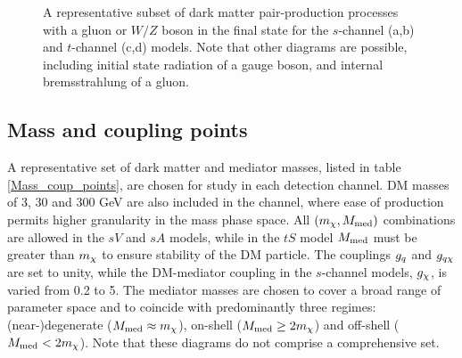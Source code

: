 \begin{figure}[t]
\begin{subfigure}[b]{0.4\textwidth}
{
    }
    \caption{}
    \label{fig:FD_tS_gluonISR}
  \end{subfigure}
  \hspace{1cm}
  \begin{subfigure}[b]{0.4\textwidth}
    \centering
    \caption{}
    \label{fig:FD_tS_WZmediator}
  \end{subfigure}
  \caption{A representative subset of dark matter pair-production processes with a gluon or $W/Z$ boson in the final state for the $s$-channel (a,b) and $t$-channel (c,d) models. Note that other diagrams are possible, including initial state radiation of a gauge boson, and internal bremsstrahlung of a gluon.}
  \label{allchannel_sig_phen}
\end{figure}

\subsection{Mass and coupling points}
A representative set of dark matter and mediator masses, listed in table \ref{Mass_coup_points}, are chosen for study in each detection channel. DM masses of 3, 30 and 300 GeV are also included in the \monoZ channel, where ease of production permits higher granularity in the mass phase space. All $(m_{\chi}, M_{\mathrm{med}})$ combinations are allowed in the $sV$ and $sA$ models, while in the $tS$ model $M_{\mathrm{med}}$ must be greater than $m_{\chi}$ to ensure stability of the DM particle. The couplings $g_q$ and $g_{q \chi}$ are set to unity, while the DM-mediator coupling in the $s$-channel models, $g_{\chi}$, is varied from 0.2 to 5. The mediator masses are chosen to cover a broad range of parameter space and to coincide with predominantly three regimes: (near-)degenerate ($M_{\mathrm{med}} \approx m_{\chi}$), on-shell ($M_{\mathrm{med}} \geq 2 m_{\chi}$) and off-shell ($M_{\mathrm{med}} < 2 m_{\chi}$). Note that these diagrams do not comprise a comprehensive set.

